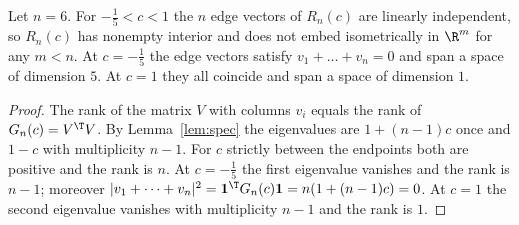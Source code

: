 \begin{theorem}\label{thm:main}
Let $n=6$. For $- \frac{1}{5}<c<1$ the $n$ edge vectors of $R_n(c)$ are linearly independent, so $R_n(c)$ has nonempty interior and does not embed isometrically in $\R^m$ for any $m<n$.
At $c=- \frac{1}{5}$ the edge vectors satisfy $v_1+\dots+v_n=0$ and span a space of dimension $5$.
At $c=1$ they all coincide and span a space of dimension $1$.
\end{theorem}
\begin{proof}
The rank of the matrix $V$ with columns $v_i$ equals the rank of $G_n(c)=V^\T V$.
By Lemma~\ref{lem:spec} the eigenvalues are $1+(n-1)c$ once and $1-c$ with multiplicity $n-1$.
For $c$ strictly between the endpoints both are positive and the rank is $n$.
At $c=- \frac{1}{5}$ the first eigenvalue vanishes and the rank is $n-1$; moreover $|v_1+\dots+v_n|^2=\mathbf 1^\T G_n(c)\mathbf 1=n(1+(n-1)c)=0$.
At $c=1$ the second eigenvalue vanishes with multiplicity $n-1$ and the rank is $1$.
\end{proof}

